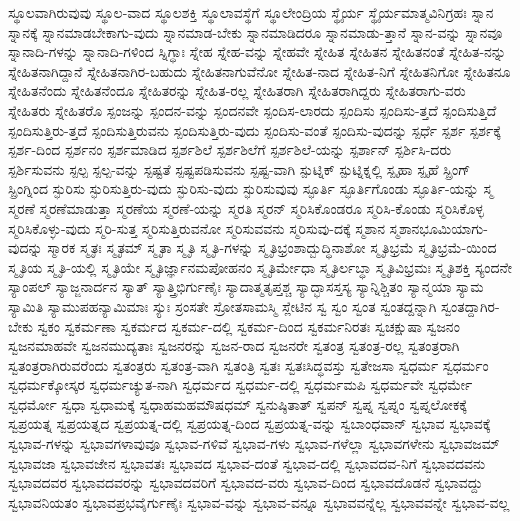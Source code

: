 {ಸ್ಥೂಲವಾಗಿರುವುವು
ಸ್ಥೂಲ-ವಾದ
ಸ್ಥೂಲಶಕ್ತಿ
ಸ್ಥೂಲಾವಸ್ಥೆಗೆ
ಸ್ಥೂಲೇಂದ್ರಿಯ
ಸ್ಥೈರ್ಯ
ಸ್ಥೈರ್ಯಮಾತ್ಮವಿನಿಗ್ರಹಃ
ಸ್ನಾನ
ಸ್ನಾನಕ್ಕೆ
ಸ್ನಾನಮಾಡಬೇಕಾಗು-ವುದು
ಸ್ನಾನಮಾಡ-ಬೇಕು
ಸ್ನಾನಮಾಡಿದರೂ
ಸ್ನಾನಮಾಡು-ತ್ತಾನೆ
ಸ್ನಾನ-ವನ್ನು
ಸ್ನಾನವೂ
ಸ್ನಾನಾದಿ-ಗಳನ್ನು
ಸ್ನಾನಾದಿ-ಗಳಿಂದ
ಸ್ನಿಗ್ಧಾಃ
ಸ್ನೇಹ
ಸ್ನೇಹ-ವನ್ನು
ಸ್ನೇಹವೇ
ಸ್ನೇಹಿತ
ಸ್ನೇಹಿತನ
ಸ್ನೇಹಿತನಂತೆ
ಸ್ನೇಹಿತ-ನನ್ನು
ಸ್ನೇಹಿತನಾಗಿದ್ದಾನೆ
ಸ್ನೇಹಿತನಾಗಿರ-ಬಹುದು
ಸ್ನೇಹಿತನಾಗುವೆನೋ
ಸ್ನೇಹಿತ-ನಾದ
ಸ್ನೇಹಿತ-ನಿಗೆ
ಸ್ನೇಹಿತನಿಗೋ
ಸ್ನೇಹಿತನೂ
ಸ್ನೇಹಿತನೆಂದು
ಸ್ನೇಹಿತನೆಂದೂ
ಸ್ನೇಹಿತರನ್ನು
ಸ್ನೇಹಿತ-ರಲ್ಲ
ಸ್ನೇಹಿತರಾಗಿ
ಸ್ನೇಹಿತರಾಗಿದ್ದರು
ಸ್ನೇಹಿತರಾಗು-ವರು
ಸ್ನೇಹಿತರು
ಸ್ನೇಹಿತರೊ
ಸ್ಪಂಜನ್ನು
ಸ್ಪಂದನ-ವನ್ನು
ಸ್ಪಂದನವೇ
ಸ್ಪಂದಿಸ-ಲಾರದು
ಸ್ಪಂದಿಸು
ಸ್ಪಂದಿಸು-ತ್ತದೆ
ಸ್ಪಂದಿಸುತ್ತಿದೆ
ಸ್ಪಂದಿಸುತ್ತಿರು-ತ್ತದೆ
ಸ್ಪಂದಿಸುತ್ತಿರುವನು
ಸ್ಪಂದಿಸುತ್ತಿರು-ವುದು
ಸ್ಪಂದಿಸು-ವಂತೆ
ಸ್ಪಂದಿಸು-ವುದನ್ನು
ಸ್ಪರ್ಧೆ
ಸ್ಪರ್ಶ
ಸ್ಪರ್ಶಕ್ಕೆ
ಸ್ಪರ್ಶ-ದಿಂದ
ಸ್ಪರ್ಶನಂ
ಸ್ಪರ್ಶಮಾಡಿದ
ಸ್ಪರ್ಶಶಿಲೆ
ಸ್ಪರ್ಶಶಿಲೆಗೆ
ಸ್ಪರ್ಶಶಿಲೆ-ಯನ್ನು
ಸ್ಪರ್ಶಾನ್
ಸ್ಪರ್ಶಿಸಿ-ದರು
ಸ್ಪರ್ಶಿಸುವನು
ಸ್ಪಲ್ಪ
ಸ್ಪಲ್ಪ-ವನ್ನು
ಸ್ಪಷ್ಟತೆ
ಸ್ಪಷ್ಟಪಡಿಸುವನು
ಸ್ಪಷ್ಟ-ವಾಗಿ
ಸ್ಪುಟ್ನಿಕ್
ಸ್ಪುಟ್ನಿಕ್ನಲ್ಲಿ
ಸ್ಪೃಹಾ
ಸ್ಪೃಹೆ
ಸ್ಪ್ರಿಂಗ್
ಸ್ಪ್ರಿಂಗ್ನಿಂದ
ಸ್ಫುರಿಸು
ಸ್ಫುರಿಸುತ್ತಿರು-ವುದು
ಸ್ಫುರಿಸು-ವುದು
ಸ್ಫುರಿಸುವುವು
ಸ್ಫೂರ್ತಿ
ಸ್ಫೂರ್ತಿಗೊಂಡು
ಸ್ಫೂರ್ತಿ-ಯನ್ನು
ಸ್ಮ
ಸ್ಮರಣೆ
ಸ್ಮರಣೆಮಾಡುತ್ತಾ
ಸ್ಮರಣೆಯ
ಸ್ಮರಣೆ-ಯನ್ನು
ಸ್ಮರತಿ
ಸ್ಮರನ್
ಸ್ಮರಿಸಿಕೊಂಡರೂ
ಸ್ಮರಿಸಿ-ಕೊಂಡು
ಸ್ಮರಿಸಿಕೊಳ್ಳ
ಸ್ಮರಿಸಿಕೊಳ್ಳು-ವುದು
ಸ್ಮರಿ-ಸುತ್ತ
ಸ್ಮರಿಸುತ್ತಿರುವನೋ
ಸ್ಮರಿಸುವವನು
ಸ್ಮರಿಸುವು-ದಕ್ಕೆ
ಸ್ಮಶಾನ
ಸ್ಮಶಾನಭೂಮಿಯಾಗು-ವುದನ್ನು
ಸ್ಮಾರಕ
ಸ್ಮೃತಃ
ಸ್ಮೃತಮ್
ಸ್ಮೃತಾ
ಸ್ಮೃತಿ
ಸ್ಮೃತಿ-ಗಳನ್ನು
ಸ್ಮೃತಿಭ್ರಂಶಾದ್ಬುದ್ಧಿನಾಶೋ
ಸ್ಮೃತಿಭ್ರಮೆ
ಸ್ಮೃತಿಭ್ರಮೆ-ಯಿಂದ
ಸ್ಮೃತಿಯ
ಸ್ಮೃತಿ-ಯಲ್ಲಿ
ಸ್ಮೃತಿಯೇ
ಸ್ಮೃತಿರ್ಜ್ಞಾನಮಪೋಹನಂ
ಸ್ಮೃತಿರ್ಮೇಧಾ
ಸ್ಮೃತಿರ್ಲಬ್ಧಾ
ಸ್ಮೃತಿವಿಭ್ರಮಃ
ಸ್ಮೃತಿಶಕ್ತಿ
ಸ್ಯಂದನೇ
ಸ್ಯಾಂಪಲ್
ಸ್ಯಾಜ್ಜನಾರ್ದನ
ಸ್ಯಾತ್
ಸ್ಯಾತ್ತ್ರಿಭಿರ್ಗುಣೈಃ
ಸ್ಯಾದಾತ್ಮತೃಪ್ತಶ್ಚ
ಸ್ಯಾದ್ಭಾಸಸ್ತಸ್ಯ
ಸ್ಯಾನ್ನಿಶ್ಚಿತಂ
ಸ್ಯಾನ್ಮಯಾ
ಸ್ಯಾಮ
ಸ್ಯಾಮಿತಿ
ಸ್ಯಾಮುಪಹನ್ಯಾಮಿಮಾಃ
ಸ್ಯುಃ
ಸ್ರಂಸತೇ
ಸ್ರೋತಸಾಮಸ್ಮಿ
ಸ್ಲೇಟಿನ
ಸ್ವ
ಸ್ವಂ
ಸ್ವಂತ
ಸ್ವಂತದ್ದನ್ನಾಗಿ
ಸ್ವಂತದ್ದಾಗಿರ-ಬೇಕು
ಸ್ವಕಂ
ಸ್ವಕರ್ಮಣಾ
ಸ್ವಕರ್ಮದ
ಸ್ವಕರ್ಮ-ದಲ್ಲಿ
ಸ್ವಕರ್ಮ-ದಿಂದ
ಸ್ವಕರ್ಮನಿರತಃ
ಸ್ವಚಕ್ಷುಷಾ
ಸ್ವಜನಂ
ಸ್ವಜನಮಾಹವೇ
ಸ್ವಜನಮುದ್ಯತಾಃ
ಸ್ವಜನರನ್ನು
ಸ್ವಜನ-ರಾದ
ಸ್ವಜನರೇ
ಸ್ವತಂತ್ರ
ಸ್ವತಂತ್ರ-ರಲ್ಲ
ಸ್ವತಂತ್ರರಾಗಿ
ಸ್ವತಂತ್ರರಾಗಿರುವರೆಂದು
ಸ್ವತಂತ್ರರು
ಸ್ವತಂತ್ರ-ವಾಗಿ
ಸ್ವತಂತ್ರಿ
ಸ್ವತಃ
ಸ್ವತಃಸಿದ್ಧವಸ್ತು
ಸ್ವತೇಜಸಾ
ಸ್ವಧರ್ಮ
ಸ್ವಧರ್ಮಂ
ಸ್ವಧರ್ಮಕ್ಕೋಸ್ಕರ
ಸ್ವಧರ್ಮಚ್ಯುತ-ನಾಗಿ
ಸ್ವಧರ್ಮದ
ಸ್ವಧರ್ಮ-ದಲ್ಲಿ
ಸ್ವಧರ್ಮಮಪಿ
ಸ್ವಧರ್ಮವೇ
ಸ್ವಧರ್ಮೇ
ಸ್ವಧರ್ಮೋ
ಸ್ವಧಾ
ಸ್ವಧಾಮಕ್ಕೆ
ಸ್ವಧಾಹಮಹಮೌಷಧಮ್
ಸ್ವನುಷ್ಠಿತಾತ್
ಸ್ವಪನ್
ಸ್ವಪ್ನ
ಸ್ವಪ್ನಂ
ಸ್ವಪ್ನಲೋಕಕ್ಕೆ
ಸ್ವಪ್ರಯತ್ನ
ಸ್ವಪ್ರಯತ್ನದ
ಸ್ವಪ್ರಯತ್ನ-ದಲ್ಲಿ
ಸ್ವಪ್ರಯತ್ನ-ದಿಂದ
ಸ್ವಪ್ರಯತ್ನ-ವನ್ನು
ಸ್ವಬಾಂಧವಾನ್
ಸ್ವಭಾವ
ಸ್ವಭಾವಕ್ಕೆ
ಸ್ವಭಾವ-ಗಳನ್ನು
ಸ್ವಭಾವಗಳಾವುವೂ
ಸ್ವಭಾವ-ಗಳಿವೆ
ಸ್ವಭಾವ-ಗಳು
ಸ್ವಭಾವ-ಗಳೆಲ್ಲಾ
ಸ್ವಭಾವಗಳೇನು
ಸ್ವಭಾವಜಮ್
ಸ್ವಭಾವಜಾ
ಸ್ವಭಾವಜೇನ
ಸ್ವಭಾವತಃ
ಸ್ವಭಾವದ
ಸ್ವಭಾವ-ದಂತೆ
ಸ್ವಭಾವ-ದಲ್ಲಿ
ಸ್ವಭಾವದವ-ನಿಗೆ
ಸ್ವಭಾವದವನು
ಸ್ವಭಾವದವರ
ಸ್ವಭಾವದವರನ್ನು
ಸ್ವಭಾವದವರಿಗೆ
ಸ್ವಭಾವದ-ವರು
ಸ್ವಭಾವ-ದಿಂದ
ಸ್ವಭಾವದೊಡನೆ
ಸ್ವಭಾವದ್ದು
ಸ್ವಭಾವನಿಯತಂ
ಸ್ವಭಾವಪ್ರಭವೈರ್ಗುಣೈಃ
ಸ್ವಭಾವ-ವನ್ನು
ಸ್ವಭಾವ-ವನ್ನೂ
ಸ್ವಭಾವವನ್ನೆಲ್ಲ
ಸ್ವಭಾವವನ್ನೇ
ಸ್ವಭಾವ-ವಲ್ಲ
}
